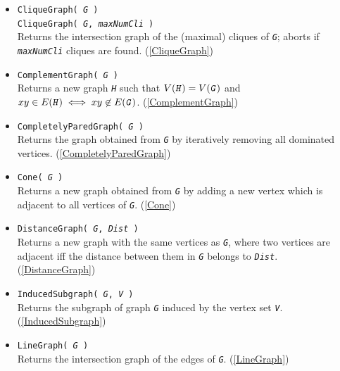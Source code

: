 \documentclass[a4paper,11pt]{report}
\begin{document}
{{\begin{itemize}
\item \texttt{CliqueGraph( \mbox{\texttt{\mdseries\slshape G}} )}\\
 \texttt{CliqueGraph( \mbox{\texttt{\mdseries\slshape G}}, \mbox{\texttt{\mdseries\slshape maxNumCli}} )}\\
 Returns the intersection graph of the (maximal) cliques of \mbox{\texttt{\mdseries\slshape G}}; aborts if \mbox{\texttt{\mdseries\slshape maxNumCli}} cliques are found. (\ref{CliqueGraph}) 
\item \texttt{ComplementGraph( \mbox{\texttt{\mdseries\slshape G}} )}\\
 Returns a new graph \mbox{\texttt{\mdseries\slshape H}} such that $V(\mbox{\texttt{\mdseries\slshape H}})=V(\mbox{\texttt{\mdseries\slshape G}})$ and $xy\in E(\mbox{\texttt{\mdseries\slshape H}}) \iff xy \not\in E(\mbox{\texttt{\mdseries\slshape G}})$. (\ref{ComplementGraph}) 
\item \texttt{CompletelyParedGraph( \mbox{\texttt{\mdseries\slshape G}} )}\\
 Returns the graph obtained from \mbox{\texttt{\mdseries\slshape G}} by iteratively removing all dominated vertices. (\ref{CompletelyParedGraph}) 
\item \texttt{Cone( \mbox{\texttt{\mdseries\slshape G}} )}\\
 Returns a new graph obtained from \mbox{\texttt{\mdseries\slshape G}} by adding a new vertex which is adjacent to all vertices of \mbox{\texttt{\mdseries\slshape G}}. (\ref{Cone}) 
\item \texttt{DistanceGraph( \mbox{\texttt{\mdseries\slshape G}}, \mbox{\texttt{\mdseries\slshape Dist}} )}\\
 Returns a new graph with the same vertices as \mbox{\texttt{\mdseries\slshape G}}, where two vertices are adjacent iff the distance between them in \mbox{\texttt{\mdseries\slshape G}} belongs to \mbox{\texttt{\mdseries\slshape Dist}}. (\ref{DistanceGraph}) 
\item \texttt{InducedSubgraph( \mbox{\texttt{\mdseries\slshape G}}, \mbox{\texttt{\mdseries\slshape V}} )}\\
 Returns the subgraph of graph \mbox{\texttt{\mdseries\slshape G}} induced by the vertex set \mbox{\texttt{\mdseries\slshape V}}. (\ref{InducedSubgraph}) 
\item \texttt{LineGraph( \mbox{\texttt{\mdseries\slshape G}} )}\\
 Returns the intersection graph of the edges of \mbox{\texttt{\mdseries\slshape G}}. (\ref{LineGraph}) 

\end{itemize}}}
\end{document}
